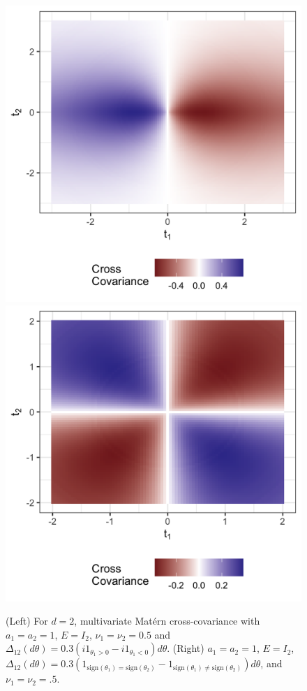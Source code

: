 \documentclass[11pt]{article}
\begin{document}
\begin{figure}
\centering
\includegraphics[scale = .15]{../asymmetric_spat.png}
\includegraphics[scale = .15]{../asymmetric_spat_theta_weird.png}
\caption{
(Left) For $d=2$, multivariate Mat\'ern cross-covariance with $a_1 = a_2 = 1$, $E = I_2$, $\nu_1 = \nu_2 = 0.5$ and $\Delta_{12}(d\theta) = 0.3(i1_{\theta_1 > 0} - i1_{\theta_1 < 0})d\theta$.  (Right) $a_1 = a_2 = 1$, $E = I_2$, $\Delta_{12}(d\theta) = 0.3\left(1_{\textrm{sign}(\theta_1) = \textrm{sign}(\theta_2)} - 1_{\textrm{sign}(\theta_1) \neq \textrm{sign}(\theta_2)}\right) d\theta$, and $\nu_1 = \nu_2 = .5$.}
\label{fig:spatial2}
\end{figure}
\end{document}

